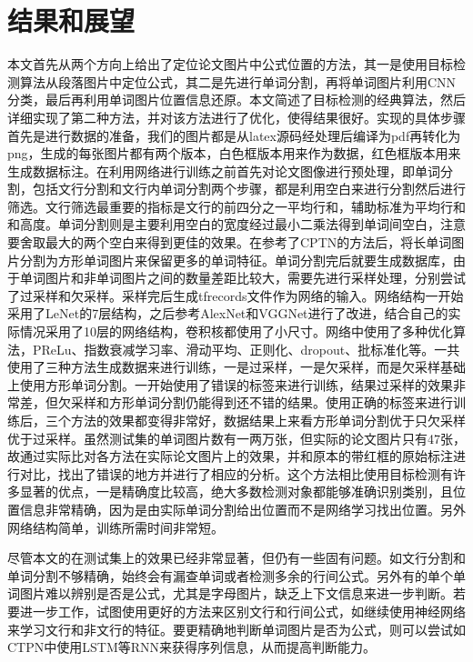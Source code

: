 

\chapter{结果和展望}

本文首先从两个方向上给出了定位论文图片中公式位置的方法，其一是使用目标检测算法从段落图片中定位公式，其二是先进行单词分割，再将单词图片利用CNN分类，最后再利用单词图片位置信息还原。本文简述了目标检测的经典算法，然后详细实现了第二种方法，并对该方法进行了优化，使得结果很好。实现的具体步骤首先是进行数据的准备，我们的图片都是从latex源码经处理后编译为pdf再转化为png，生成的每张图片都有两个版本，白色框版本用来作为数据，红色框版本用来生成数据标注。在利用网络进行训练之前首先对论文图像进行预处理，即单词分割，包括文行分割和文行内单词分割两个步骤，都是利用空白来进行分割然后进行筛选。文行筛选最重要的指标是文行的前四分之一平均行和，辅助标准为平均行和和高度。单词分割则是主要利用空白的宽度经过最小二乘法得到单词间空白，注意要舍取最大的两个空白来得到更佳的效果。在参考了CPTN的方法后，将长单词图片分割为方形单词图片来保留更多的单词特征。单词分割完后就要生成数据库，由于单词图片和非单词图片之间的数量差距比较大，需要先进行采样处理，分别尝试了过采样和欠采样。采样完后生成tfrecords文件作为网络的输入。网络结构一开始采用了LeNet的7层结构，之后参考AlexNet和VGGNet进行了改进，结合自己的实际情况采用了10层的网络结构，卷积核都使用了小尺寸。网络中使用了多种优化算法，PReLu、指数衰减学习率、滑动平均、正则化、dropout、批标准化等。一共使用了三种方法生成数据来进行训练，一是过采样，一是欠采样，而是欠采样基础上使用方形单词分割。一开始使用了错误的标签来进行训练，结果过采样的效果非常差，但欠采样和方形单词分割仍能得到还不错的结果。使用正确的标签来进行训练后，三个方法的效果都变得非常好，数据结果上来看方形单词分割优于只欠采样优于过采样。虽然测试集的单词图片数有一两万张，但实际的论文图片只有47张，故通过实际比对各方法在实际论文图片上的效果，并和原本的带红框的原始标注进行对比，找出了错误的地方并进行了相应的分析。这个方法相比使用目标检测有许多显著的优点，一是精确度比较高，绝大多数检测对象都能够准确识别类别，且位置信息非常精确，因为是由实际单词分割给出位置而不是网络学习找出位置。另外网络结构简单，训练所需时间非常短。

尽管本文的在测试集上的效果已经非常显著，但仍有一些固有问题。如文行分割和单词分割不够精确，始终会有漏查单词或者检测多余的行间公式。另外有的单个单词图片难以辨别是否是公式，尤其是字母图片，缺乏上下文信息来进一步判断。若要进一步工作，试图使用更好的方法来区别文行和行间公式，如继续使用神经网络来学习文行和非文行的特征。要更精确地判断单词图片是否为公式，则可以尝试如CTPN中使用LSTM等RNN来获得序列信息，从而提高判断能力。



